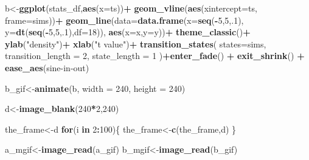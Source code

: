 \documentclass[
]{book}
\newenvironment{Shaded}{\begin{snugshade}}{\end{snugshade}}
\newcommand{\AttributeTok}[1]{\textcolor[rgb]{0.13,0.29,0.53}{#1}}
\newcommand{\ControlFlowTok}[1]{\textcolor[rgb]{0.13,0.29,0.53}{\textbf{#1}}}
\newcommand{\DecValTok}[1]{\textcolor[rgb]{0.00,0.00,0.81}{#1}}
\newcommand{\FunctionTok}[1]{\textcolor[rgb]{0.13,0.29,0.53}{\textbf{#1}}}
\newcommand{\NormalTok}[1]{#1}
\newcommand{\OtherTok}[1]{\textcolor[rgb]{0.56,0.35,0.01}{#1}}
\newcommand{\SpecialCharTok}[1]{\textcolor[rgb]{0.81,0.36,0.00}{\textbf{#1}}}
\newcommand{\StringTok}[1]{\textcolor[rgb]{0.31,0.60,0.02}{#1}}
\begin{document}
\begin{Shaded}
\begin{Highlighting}[]
\NormalTok{b}\OtherTok{\textless{}{-}}\FunctionTok{ggplot}\NormalTok{(stats\_df,}\FunctionTok{aes}\NormalTok{(}\AttributeTok{x=}\NormalTok{ts))}\SpecialCharTok{+}
  \FunctionTok{geom\_vline}\NormalTok{(}\FunctionTok{aes}\NormalTok{(}\AttributeTok{xintercept=}\NormalTok{ts, }\AttributeTok{frame=}\NormalTok{sims))}\SpecialCharTok{+}
  \FunctionTok{geom\_line}\NormalTok{(}\AttributeTok{data=}\FunctionTok{data.frame}\NormalTok{(}\AttributeTok{x=}\FunctionTok{seq}\NormalTok{(}\SpecialCharTok{{-}}\DecValTok{5}\NormalTok{,}\DecValTok{5}\NormalTok{,.}\DecValTok{1}\NormalTok{),}
                            \AttributeTok{y=}\FunctionTok{dt}\NormalTok{(}\FunctionTok{seq}\NormalTok{(}\SpecialCharTok{{-}}\DecValTok{5}\NormalTok{,}\DecValTok{5}\NormalTok{,.}\DecValTok{1}\NormalTok{),}\AttributeTok{df=}\DecValTok{18}\NormalTok{)),}
            \FunctionTok{aes}\NormalTok{(}\AttributeTok{x=}\NormalTok{x,}\AttributeTok{y=}\NormalTok{y))}\SpecialCharTok{+}
  \FunctionTok{theme\_classic}\NormalTok{()}\SpecialCharTok{+}
  \FunctionTok{ylab}\NormalTok{(}\StringTok{"density"}\NormalTok{)}\SpecialCharTok{+}
  \FunctionTok{xlab}\NormalTok{(}\StringTok{"t value"}\NormalTok{)}\SpecialCharTok{+}
  \FunctionTok{transition\_states}\NormalTok{(}
    \AttributeTok{states=}\NormalTok{sims,}
    \AttributeTok{transition\_length =} \DecValTok{2}\NormalTok{,}
    \AttributeTok{state\_length =} \DecValTok{1}
\NormalTok{  )}\SpecialCharTok{+}\FunctionTok{enter\_fade}\NormalTok{() }\SpecialCharTok{+} 
  \FunctionTok{exit\_shrink}\NormalTok{() }\SpecialCharTok{+}
  \FunctionTok{ease\_aes}\NormalTok{(}\StringTok{\textquotesingle{}sine{-}in{-}out\textquotesingle{}}\NormalTok{)}

\NormalTok{b\_gif}\OtherTok{\textless{}{-}}\FunctionTok{animate}\NormalTok{(b, }\AttributeTok{width =} \DecValTok{240}\NormalTok{, }\AttributeTok{height =} \DecValTok{240}\NormalTok{)}


\NormalTok{d}\OtherTok{\textless{}{-}}\FunctionTok{image\_blank}\NormalTok{(}\DecValTok{240}\SpecialCharTok{*}\DecValTok{2}\NormalTok{,}\DecValTok{240}\NormalTok{)}

\NormalTok{the\_frame}\OtherTok{\textless{}{-}}\NormalTok{d}
\ControlFlowTok{for}\NormalTok{(i }\ControlFlowTok{in} \DecValTok{2}\SpecialCharTok{:}\DecValTok{100}\NormalTok{)\{}
\NormalTok{  the\_frame}\OtherTok{\textless{}{-}}\FunctionTok{c}\NormalTok{(the\_frame,d)}
\NormalTok{\}}

\NormalTok{a\_mgif}\OtherTok{\textless{}{-}}\FunctionTok{image\_read}\NormalTok{(a\_gif)}
\NormalTok{b\_mgif}\OtherTok{\textless{}{-}}\FunctionTok{image\_read}\NormalTok{(b\_gif)}


\end{Highlighting}
\end{Shaded}
\end{document}
